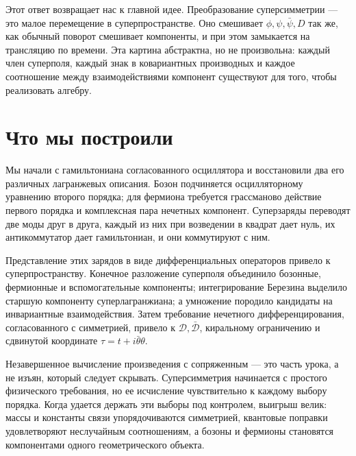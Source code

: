 \begin{classroomqa}
\end{classroomqa}

Этот ответ возвращает нас к главной идее. Преобразование суперсимметрии — это малое перемещение в суперпространстве. Оно смешивает \(\phi,\psi,\bar\psi,D\) так же, как обычный поворот смешивает компоненты, и при этом замыкается на трансляцию по времени. Эта картина абстрактна, но не произвольна: каждый член суперполя, каждый знак в ковариантных производных и каждое соотношение между взаимодействиями компонент существуют для того, чтобы реализовать алгебру.

\section{Что мы построили}

Мы начали с гамильтониана согласованного осциллятора и восстановили два его различных лагранжевых описания. Бозон подчиняется осцилляторному уравнению второго порядка; для фермиона требуется грассманово действие первого порядка и комплексная пара нечетных компонент. Суперзаряды переводят две моды друг в друга, каждый из них при возведении в квадрат дает нуль, их антикоммутатор дает гамильтониан, и они коммутируют с ним.

Представление этих зарядов в виде дифференциальных операторов привело к суперпространству. Конечное разложение суперполя объединило бозонные, фермионные и вспомогательные компоненты; интегрирование Березина выделило старшую компоненту суперлагранжиана; а умножение породило кандидаты на инвариантные взаимодействия. Затем требование нечетного дифференцирования, согласованного с симметрией, привело к \(\mathcal D,\bar{\mathcal D}\), киральному ограничению и сдвинутой координате \(\tau=t+i\bar\theta\theta\).

Незавершенное вычисление произведения с сопряженным — это часть урока, а не изъян, который следует скрывать. Суперсимметрия начинается с простого физического требования, но ее исчисление чувствительно к каждому выбору порядка. Когда удается держать эти выборы под контролем, выигрыш велик: массы и константы связи упорядочиваются симметрией, квантовые поправки удовлетворяют неслучайным соотношениям, а бозоны и фермионы становятся компонентами одного геометрического объекта.